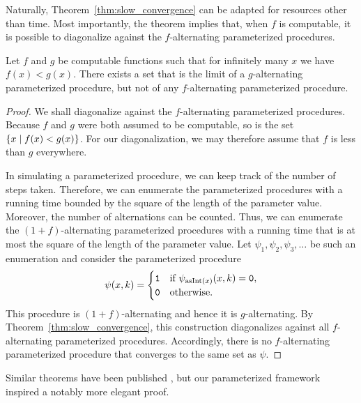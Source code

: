 Naturally, Theorem~\ref{thm:slow_convergence} can be adapted for resources other than time.
Most importantly, the theorem implies that, when $f$ is computable, it is possible to diagonalize against the $f$-alternating parameterized procedures.
\begin{theorem}
\label{thm:computable_hierarchy}
  Let $f$ and $g$ be computable functions such that for infinitely many $x$ we have $f(x) < g(x)$.
  There exists a set that is the limit of a $g$-alternating parameterized procedure, but not of any $f$-alternating parameterized procedure.
\end{theorem}
\begin{proof}
  We shall diagonalize against the $f$-alternating parameterized procedures.
  Because $f$ and $g$ were both assumed to be computable, so is the set $\{x \;{|}\; f(x) < g(x)\}$.
  For our diagonalization, we may therefore assume that $f$ is less than $g$ everywhere.

  In simulating a parameterized procedure, we can keep track of the number of steps taken.
  Therefore, we can enumerate the parameterized procedures with a running time bounded by the square of the length of the parameter value.
  Moreover, the number of alternations can be counted.
  Thus, we can enumerate the $(1 + f)$-alternating parameterized procedures with a running time that is at most the square of the length of the parameter value.
  Let $\psi_1, \psi_2, \psi_3, \ldots$ be such an enumeration and consider the parameterized procedure
  \begin{equation*}
    \psi(x, k) = \begin{cases}
      \textnormal{\texttt{1}}	& \text{if $\psi_{\operatorname{asInt}(x)}(x, k) = \textnormal{\texttt{0}}$}, \\
      \textnormal{\texttt{0}}	& \text{otherwise}.
    \end{cases}
  \end{equation*}
  This procedure is $(1 + f)$-alternating and hence it is $g$-alternating.
  By Theorem~\ref{thm:slow_convergence}, this construction diagonalizes against all $f$-alternating parameterized procedures.
  Accordingly, there is no $f$-alternating parameterized procedure that converges to the same set as $\psi$.
\end{proof}

Similar theorems have been published \parencite{epstein1981hierarchies,arslanov1997degree}, but our parameterized framework inspired a notably more elegant proof.

